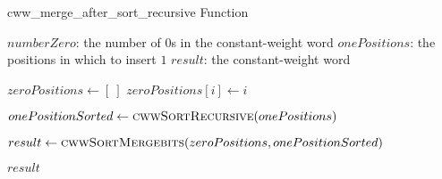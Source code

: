             \begin{frame}[containsverbatim]{\cwwmergeaftersortrecursivefunctionframe}
                \begingroup
                    \makeatletter
                    \renewcommand{\alglinenumber}[1]{\scriptsize#1}
                    \makeatother
                    \begin{algorithm}[H]
                        \scriptsize
                        \caption{cww\_merge\_after\_sort\_recursive Function} \label{cww_merge_after_sort_recursive function}
                        \begin{algorithmic}[1]
                            \Require 
                                \Statex $numberZero$: the number of $0$s in the constant-weight word
                                \Statex $onePositions$: the positions in which to insert $1$
                            \Ensure
                                \Statex $result$: the constant-weight word
                            \Statex
            
                                \State $zeroPositions \gets \left[\ \right]$
                                    \State $zeroPositions{\left[i\right]} \gets i$
                                \EndFor

                                \State $onePositionSorted \gets \Call{cwwSortRecursive}{onePositions}$

                                \State $result \gets \Call{cwwSortMergebits}{zeroPositions, onePositionSorted}$
    
                                \State \Return $result$
                            \EndFunction
                        \end{algorithmic}
                    \end{algorithm}
                \endgroup
            \end{frame}

